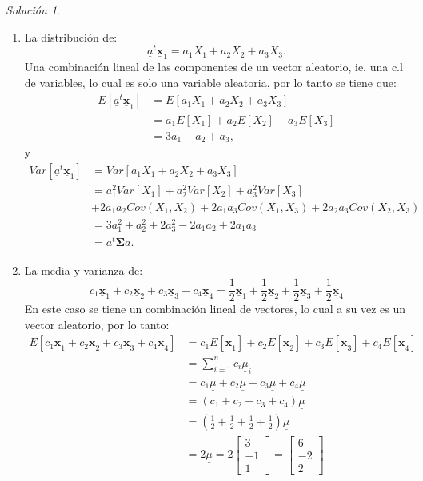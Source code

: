 \documentclass[
]{book}
\theoremstyle{definition}
\theoremstyle{definition}
\theoremstyle{definition}
\theoremstyle{definition}
\theoremstyle{remark}
\newtheorem*{solution}{Solución}
\begin{document}
\begin{solution}
\leavevmode

\begin{enumerate}
\def\labelenumi{\arabic{enumi}.}
\item
  La distribución de:
  \[
  \underline{a}^t\underline{\mathbf{x}}_1=a_1X_1+a_2X_2+a_3X_3.
  \]
  Una combinación lineal de las componentes de un vector aleatorio, ie. una c.l de variables, lo cual es solo una variable aleatoria, por lo tanto se tiene que:
  \begin{align*}
  E[\underline{a}^t\underline{\mathbf{x}}_1]&=E[a_1X_1+a_2X_2+a_3X_3]\\
  &=a_1E[X_1]+a_2E[X_2]+a_3E[X_3]\\
  &=3a_1-a_2+a_3,
  \end{align*}
  y
  \begin{align*}
  Var[\underline{a}^t\underline{\mathbf{x}}_1]&=Var[a_1X_1+a_2X_2+a_3X_3]\\
  &=a_1^2Var[X_1]+a_2^2Var[X_2]+a_3^2Var[X_3]\\
  &+2a_1a_2Cov(X_1,X_2)+2a_1a_3Cov(X_1,X_3)+
  2a_2a_3Cov(X_2,X_3)\\
  &=3a_1^2+a_2^2+2a_3^2-2a_1a_2+2a_1a_3\\
  &=\underline{a}^t\mathbf{\Sigma} \underline{a}.
  \end{align*}
\item
  La media y varianza de:
  \[
  c_1\underline{\mathbf{x}}_1+c_2\underline{\mathbf{x}}_2+
  c_3\underline{\mathbf{x}}_3+
  c_4\underline{\mathbf{x}}_4=\frac{1}{2}\underline{\mathbf{x}}_1+
  \frac{1}{2}\underline{\mathbf{x}}_2+\frac{1}{2}\underline{\mathbf{x}}_3+\frac{1}{2}\underline{\mathbf{x}}_4
  \]
  En este caso se tiene un combinación lineal de vectores, lo cual a su vez es un vector aleatorio, por lo tanto:
  \begin{align*}
  E[c_1\underline{\mathbf{x}}_1+c_2\underline{\mathbf{x}}_2+
  c_3\underline{\mathbf{x}}_3+
  c_4\underline{\mathbf{x}}_4]&=c_1E[\underline{\mathbf{x}}_1]+
  c_2E[\underline{\mathbf{x}}_2]+c_3E[\underline{\mathbf{x}}_3]+
  c_4E[\underline{\mathbf{x}}_4]\\
  &=\sum_{i=1}^n c_i \underline{\mu}_i\\
  &=c_1\underline{\mu}+c_2\underline{\mu}+c_3\underline{\mu}+
  c_4\underline{\mu}\\
  &=(c_1+c_2+c_3+c_4)\underline{\mu}\\
  &=\left(\frac{1}{2}+\frac{1}{2}+\frac{1}{2}+\frac{1}{2}\right)\underline{\mu}\\
  &=2\underline{\mu}=2\begin{bmatrix}
  3 \\ -1 \\ 1
  \end{bmatrix}=\begin{bmatrix}
  6 \\-2 \\2
  \end{bmatrix}
  \end{align*}
\end{enumerate}


\end{solution}
\end{document}
